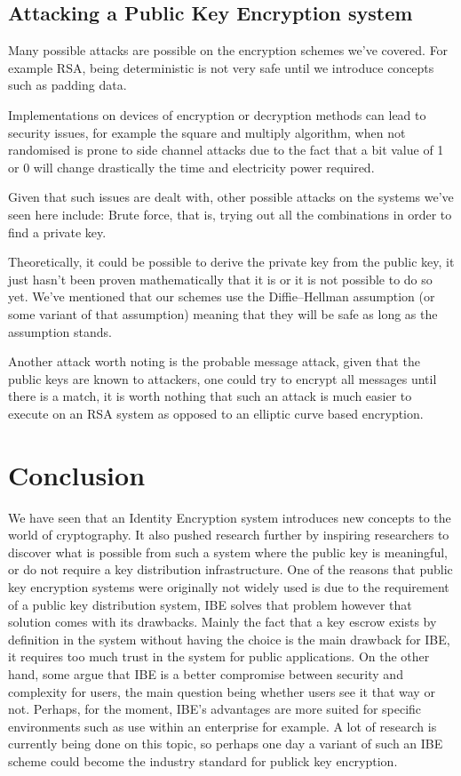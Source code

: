 \documentclass[conference]{IEEEtran}
\begin{document}
\subsection{Attacking a Public Key Encryption system}
Many possible attacks are possible on the encryption schemes we've covered.
For example RSA, being deterministic is not very safe until we introduce concepts such as 
padding data. 

Implementations on devices of encryption or decryption methods 
can lead to security issues, for example the square and multiply algorithm,
when not randomised is prone to side channel attacks due to the fact that a bit value of 1 or 0 
will change drastically the time and electricity power required.

Given that such issues are dealt with, other possible attacks on the systems we've seen here include: 
Brute force, that is, trying out all the combinations in order to find a private key.

Theoretically, it could be possible to derive the private key from the public key, it just 
hasn't been proven mathematically that it is or it is not possible to do so yet.
We've mentioned that our schemes use the Diffie–Hellman assumption (or some variant of that assumption)
meaning that they will be safe as long as the assumption stands.

Another attack worth noting is the probable message attack, given that the public keys are known 
to attackers, one could try to encrypt all messages until there is a match, it is worth nothing that 
such an attack is much easier to execute on an RSA system as opposed to an elliptic curve based encryption.


\section{Conclusion}
We have seen that an Identity Encryption system 
introduces new concepts to the world of cryptography.
It also pushed research further by inspiring researchers
to discover what is possible from such a system where the public key is 
meaningful, or do not require a key distribution infrastructure. 
One of the reasons that public key encryption systems 
were originally not widely used is due to the requirement of a public key 
distribution system, IBE solves that problem however that solution comes with 
its drawbacks. Mainly the fact that a key escrow exists by definition in the system 
without having the choice is the main drawback for IBE, it requires too much 
trust in the system for public applications. On the other hand, some argue that 
IBE is a better compromise between security and complexity for users, the main 
question being whether users see it that way or not.
Perhaps, for the moment, IBE's advantages are more suited for specific 
environments such as use within an enterprise for example.  
A lot of research is currently being done on this topic, so perhaps one day a variant 
of such an IBE scheme could become the industry standard for publick key encryption.
\end{document}
